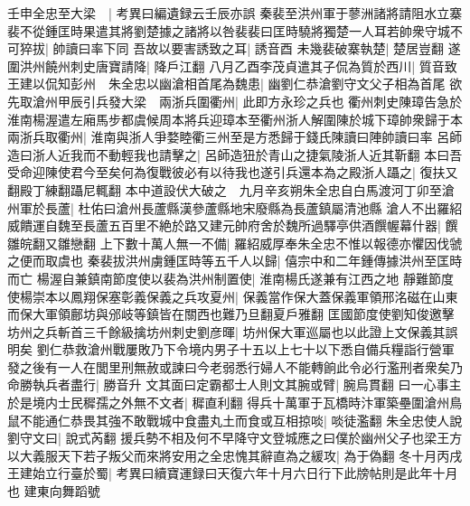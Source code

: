 壬申全忠至大梁　|{
	考異曰編遺録云壬辰亦誤}
秦裴至洪州軍于蓼洲諸將請阻水立寨裴不從鍾匡時果遣其將劉楚據之諸將以咎裴裴曰匡時驍將獨楚一人耳若帥衆守城不可猝拔|{
	帥讀曰率下同}
吾故以要害誘致之耳|{
	誘音酉}
未幾裴破寨執楚|{
	楚居豈翻}
遂圍洪州饒州刺史唐寶請降|{
	降戶江翻}
八月乙酉李茂貞遣其子侃為質於西川|{
	質音致}
王建以侃知彭州　朱全忠以幽滄相首尾為魏患|{
	幽劉仁恭滄劉守文父子相為首尾}
欲先取滄州甲辰引兵發大梁　兩浙兵圍衢州|{
	此即方永珍之兵也}
衢州刺史陳璋告急於淮南楊渥遣左廂馬步都虞候周本將兵迎璋本至衢州浙人解圍陳於城下璋帥衆歸于本兩浙兵取衢州|{
	淮南與浙人爭婺睦衢三州至是方悉歸于錢氏陳讀曰陣帥讀曰率}
呂師造曰浙人近我而不動輕我也請擊之|{
	呂師造狃於青山之捷氣陵浙人近其靳翻}
本曰吾受命迎陳使君今至矣何為復戰彼必有以待我也遂引兵還本為之殿浙人躡之|{
	復扶又翻殿丁練翻躡尼輒翻}
本中道設伏大破之　九月辛亥朔朱全忠自白馬渡河丁卯至滄州軍於長蘆|{
	杜佑曰滄州長蘆縣漢參蘆縣地宋廢縣為長蘆鎮屬清池縣}
滄人不出羅紹威饋運自魏至長蘆五百里不絶於路又建元帥府舍於魏所過驛亭供酒饌幄幕什器|{
	饌雛皖翻又雛戀翻}
上下數十萬人無一不備|{
	羅紹威厚奉朱全忠不惟以報德亦懼因伐虢之便而取虞也}
秦裴拔洪州虜鍾匡時等五千人以歸|{
	僖宗中和二年鍾傳據洪州至匡時而亡}
楊渥自兼鎮南節度使以裴為洪州制置使|{
	淮南楊氏遂兼有江西之地}
靜難節度使楊崇本以鳳翔保塞彰義保義之兵攻夏州|{
	保義當作保大蓋保義軍領邢洺磁在山東而保大軍領鄜坊與邠岐等鎮皆在關西也難乃旦翻夏戶雅翻}
匡國節度使劉知俊邀擊坊州之兵斬首三千餘級擒坊州刺史劉彦暉|{
	坊州保大軍巡屬也以此證上文保義其誤明矣}
劉仁恭救滄州戰屢敗乃下令境内男子十五以上七十以下悉自備兵糧詣行營軍發之後有一人在閭里刑無赦或諫曰今老弱悉行婦人不能轉餉此令必行濫刑者衆矣乃命勝執兵者盡行|{
	勝音升}
文其面曰定霸都士人則文其腕或臂|{
	腕烏貫翻}
曰一心事主於是境内士民穉孺之外無不文者|{
	穉直利翻}
得兵十萬軍于瓦橋時汴軍築壘圍滄州鳥鼠不能通仁恭畏其強不敢戰城中食盡丸土而食或互相掠啖|{
	啖徒濫翻}
朱全忠使人說劉守文曰|{
	說式芮翻}
援兵勢不相及何不早降守文登城應之曰僕於幽州父子也梁王方以大義服天下若子叛父而來將安用之全忠愧其辭直為之緩攻|{
	為于偽翻}
冬十月丙戌王建始立行臺於蜀|{
	考異曰續寶運録曰天復六年十月六日行下此牓帖則是此年十月也}
建東向舞蹈號

